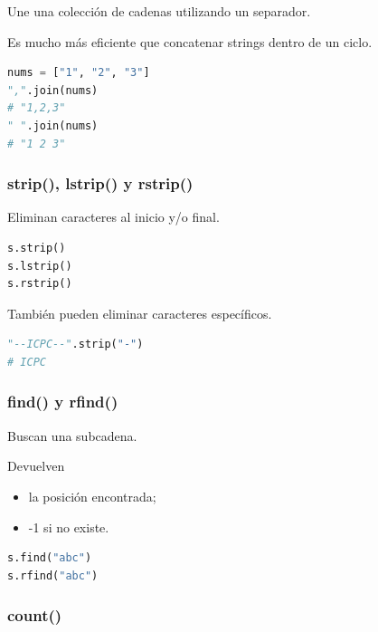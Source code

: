 Une una colección de cadenas utilizando un separador.

Es mucho más eficiente que concatenar strings dentro de un ciclo.

\begin{lstlisting}[language=Python]
nums = ["1", "2", "3"]
",".join(nums)
# "1,2,3"
" ".join(nums)
# "1 2 3"
\end{lstlisting}

 

\vspace{0.3cm}

\subsubsection{strip(), lstrip() y rstrip()}

Eliminan caracteres al inicio y/o final.

\begin{lstlisting}[language=Python]
s.strip()
s.lstrip()
s.rstrip()
\end{lstlisting}

También pueden eliminar caracteres específicos.

\begin{lstlisting}[language=Python]
"--ICPC--".strip("-")
# ICPC
\end{lstlisting}

\vspace{0.3cm}

\subsubsection{find() y rfind()}

Buscan una subcadena.

Devuelven

\begin{itemize}
\item la posición encontrada;
\item -1 si no existe.
\end{itemize}

\begin{lstlisting}[language=Python]
s.find("abc")
s.rfind("abc")
\end{lstlisting}

\vspace{0.3cm}

\subsubsection{count()}

